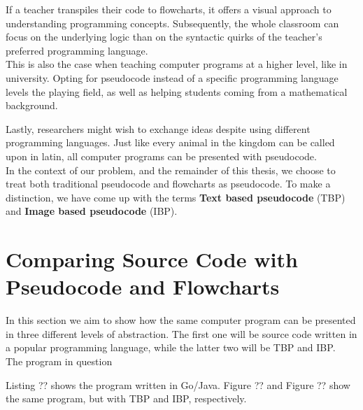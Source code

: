 If a teacher transpiles their code to flowcharts, it offers a visual approach to understanding programming concepts. Subsequently, the whole classroom can focus on the underlying logic than on the syntactic quirks of the teacher's preferred programming language. \\

This is also the case when teaching computer programs at a higher level, like in university. Opting for pseudocode instead of a specific programming language levels the playing field, as well as helping students coming from a mathematical background. \\


Lastly, researchers might wish to exchange ideas despite using different programming languages. Just like every animal in the kingdom can be called upon in latin, all computer programs can be presented with pseudocode. \\

In the context of our problem, and the remainder of this thesis, we choose to treat both traditional pseudocode and flowcharts as pseudocode. To make a distinction, we have come up with the terms \textbf{Text based pseudocode} (TBP) and \textbf{Image based pseudocode} (IBP).

\section{Comparing Source Code with Pseudocode and Flowcharts}

In this section we aim to show how the same computer program can be presented in three different levels of abstraction. The first one will be source code written in a popular programming language, while the latter two will be TBP and IBP. \\

The program in question 

Listing ?? shows the program written in Go/Java. Figure ?? and Figure ?? show the same program, but with TBP and IBP, respectively. \\

